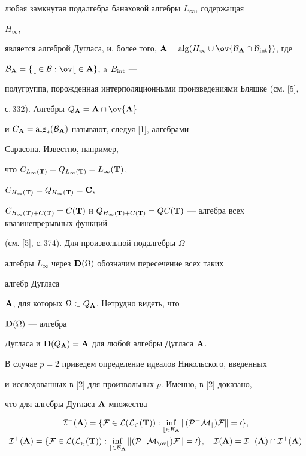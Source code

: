 любая замкнутая подалгебра банаховой алгебры $L_\infty$, содержащая 


$H_\infty$, 


является алгеброй Дугласа, и, более того, $\bold 


A=\alg(H_\infty\cup\ov{\cal B_{\bold A}\cap\cal B_{\Int}})$, где 


$\cal B_{\bold A}=\{b\in\cal B:\ov b\in\bold A\}$, a $B_{\operatorname{int}}$ --- 


полугруппа, порожденная интерполяционными произведениями Бляшке (см. [5], 


с.\,332). Алгебры $Q_{\bold A}=\bold A\cap\ov{\bold A}$ 


и $C_{\bold A}=\operatorname{alg}_*(\cal B_{\bold A})$ называют, следуя [1], алгебрами 


Сарасона. Известно, например, 


что $C_{L_\infty(\bold T)}=Q_{L_\infty(\bold T)}= L_\infty(\bold T)$, 


$C_{H_\infty(\bold T)}= Q_{H_\infty(\bold T)}=\bold C$, 


$C_{H_\infty(\bold T)+C(\bold T)}=C(\bold T)$ и $Q_{H_\infty(\bold 


T)+C(\bold T)}=QC(\bold T)$ --- алгебра всех квазинепрерывных функций 


(см. [5], с.\,374). Для произвольной подалгебры $\Omega$ 


алгебры $L_\infty$ через $\bold D(\Omega)$ обозначим пересечение всех таких 


алгебр Дугласа 


$\bold A$, для которых $\Omega\subset Q_{\bold A}$. Нетрудно видеть, что 


$\bold D(\Omega)$ --- алгебра 


Дугласа и $\bold D(Q_{\bold A})=\bold A$ для любой алгебры Дугласа $\bold 


A$. 


 


В случае $p=2$ приведем определение идеалов Никольского, введенных 


и исследованных в [2] для произвольных $p$. Именно, в [2] доказано, 


что для алгебры Дугласа $\bold A$ множества 


\begin{gather*} 


\cal I^-(\bold A)=\{F\in\cal L(L_2(\bold T)): 


\inf_{b\in\cal B_{\bold A}}\|(P^-M_b)F\|=0\},\\ 


% 


\cal I^+(\bold A)=\{F\in\cal L(L_2(\bold T)): 


\inf_{b\in\cal B_{\bold A}}\|(P^+M_{\ov b})F\|=0\},\quad


\cal I(\bold A)=\cal I^-(\bold A)\cap\cal I^+(\bold A) 


\end{gather*} 


